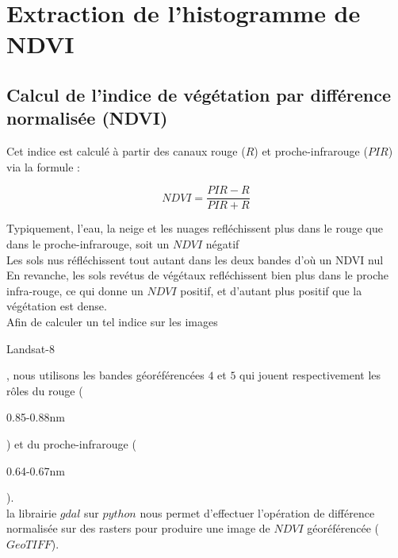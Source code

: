 \documentclass{book}
\begin{document}
\chapter{Extraction de l'histogramme de NDVI}

\section{Calcul de l'indice de végétation par différence normalisée (NDVI)}

Cet indice est calculé à partir des canaux
rouge ($R$) et proche-infrarouge ($PIR$) via la formule : 

\[NDVI=\frac{PIR-R}{PIR+R}\]

Typiquement, l'eau, la neige et les nuages refléchissent plus dans le rouge que dans le proche-infrarouge, soit un $NDVI$ négatif\\
Les sols nus réfléchissent tout autant dans les deux bandes d'où un NDVI nul\\
En revanche, les sols revétus de végétaux refléchissent bien plus dans le proche infra-rouge, ce qui donne un $NDVI$ positif, et d'autant
plus positif que la végétation est dense.\\
Afin de calculer un tel indice sur les images \begin{itshape}Landsat-8\end{itshape}, nous utilisons les bandes géoréférencées $4$ et $5$ 
qui jouent respectivement les r\^oles du rouge (\begin{itshape}0.85-0.88nm\end{itshape}) et du proche-infrarouge (\begin{itshape}0.64-0.67nm\end{itshape}).\\
la librairie $gdal$ \cite{dans-gdal} sur $python$ nous permet d'effectuer l'opération de différence normalisée sur des rasters pour produire une image de $NDVI$ géoréférencée ($GeoTIFF$).
\end{document}
